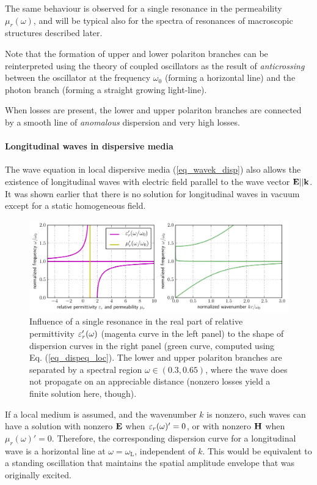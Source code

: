 The same behaviour is observed for a single resonance in the permeability $\mu_r(\omega)$, and will be typical also for the spectra of resonances of macroscopic structures described later.

Note that the formation of upper and lower polariton branches can be reinterpreted\cite{landau1984electrodynamics} using the theory of coupled oscillators as the result of \textit{anticrossing} between the oscillator at the frequency $\omega_0$ (forming a horizontal line) and the photon branch (forming a straight growing light-line).

When losses are present, the lower and upper polariton branches are connected by a smooth line of \textit{anomalous} dispersion and very high losses.  %
\paragraph{Longitudinal waves in dispersive media} %
The wave equation in local dispersive media (\ref{eq_wavek_disp}) 
also allows the existence of longitudinal waves with electric field parallel to the wave vector $\mathbf{E} || {\mathbf{k}}$. It was shown earlier that there is no solution for longitudinal waves in vacuum except for a static homogeneous field.

\begin{figure}[t] \caption{Influence of a single resonance in the real part of relative permittivity $\varepsilon_r'(\omega)$ (magenta curve in the left panel) to the shape of dispersion curves in the right panel (green curve, computed using Eq. (\ref{eq_dispeq_loc}). The lower and upper polariton branches are separated by a spectral region $\omega \in (0.3, 0.65)$, where the wave does not propagate on an appreciable distance (nonzero losses yield a finite solution here, though).} \label{fg_dcsimpleel} \centering  %
	\includegraphics[width=17cm]{img/dispersion_landau_lifshitz/dispersion_simple_el.pdf}
\end{figure}
If a local medium is assumed, and the wavenumber $k$ is nonzero, such waves can have a solution with nonzero $\mathbf{E}$ when $\varepsilon_r(\omega)' = 0$, or with nonzero $\mathbf{H}$ when $\mu_r(\omega)' = 0$. Therefore, the corresponding dispersion curve for a longitudinal wave is a horizontal line at $\omega = \omega_{\text{L}}$, independent of $k$. This would be equivalent to a standing oscillation that maintains the spatial amplitude envelope that was originally excited. 

